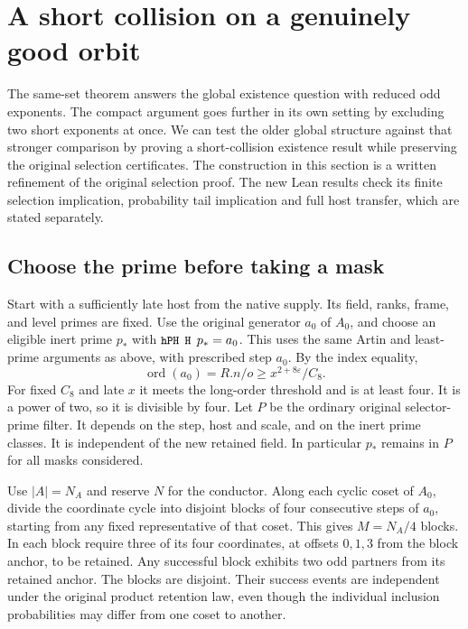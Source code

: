 \documentclass[12pt,letterpaper]{article}
\DeclareRobustCommand{\id}[1]{\mbox{\small\ttfamily #1}}
\begin{document}
\section{A short collision on a genuinely good orbit}
\label{sec:short}

The same-set theorem answers the global existence question with reduced odd exponents. The compact argument goes further in its own setting by excluding two short exponents at once. We can test the older global structure against that stronger comparison by proving a short-collision existence result while preserving the original selection certificates. The construction in this section is a written refinement of the original selection proof. The new Lean results check its finite selection implication, probability tail implication and full host transfer, which are stated separately.

\subsection{Choose the prime before taking a mask}

Start with a sufficiently late host from the native supply. Its field, ranks, frame, and level primes are fixed. Use the original generator \(a_0\) of \(A_0\), and choose an eligible inert prime \(p_\ast\) with \(\id{hPH H }p_\ast=a_0\). This uses the same Artin and least-prime arguments as above, with prescribed step \(a_0\). By the index equality,
\[
                 \operatorname{ord}(a_0)=R.n/o
                     \ge x^{2+8\varepsilon}/C_8.
\]
For fixed \(C_8\) and late \(x\) it meets the long-order threshold and is at least four. It is a power of two, so it is divisible by four. Let \(P\) be the ordinary original selector-prime filter. It depends on the step, host and scale, and on the inert prime classes. It is independent of the new retained field. In particular \(p_\ast\) remains in \(P\) for all masks considered.

Use \(|A|=N_A\) and reserve \(N\) for the conductor. Along each cyclic coset of \(A_0\), divide the coordinate cycle into disjoint blocks of four consecutive steps of \(a_0\), starting from any fixed representative of that coset. This gives \(M=N_A/4\) blocks. In each block require three of its four coordinates, at offsets \(0,1,3\) from the block anchor, to be retained. Any successful block exhibits two odd partners from its retained anchor. The blocks are disjoint. Their success events are independent under the original product retention law, even though the individual inclusion probabilities may differ from one coset to another.
\end{document}
